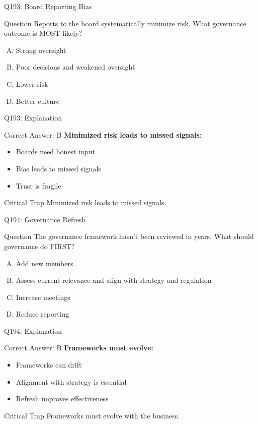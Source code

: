 \documentclass{beamer}
\begin{document}
	\begin{frame}{Q193: Board Reporting Bias}
		\begin{block}{Question}
			Reports to the board systematically minimize risk. What governance outcome is MOST likely?
		\end{block}
		\begin{enumerate}[(A)]
			\item Strong oversight
			\item Poor decisions and weakened oversight
			\item Lower risk
			\item Better culture
		\end{enumerate}
	\end{frame}
	
	\begin{frame}{Q193: Explanation}
		\begin{block}{Correct Answer: B}
			\textbf{Minimized risk leads to missed signals:}
			\begin{itemize}
				\item Boards need honest input
				\item Bias leads to missed signals
				\item Trust is fragile
			\end{itemize}
		\end{block}
		\begin{alertblock}{Critical Trap}
			Minimized risk leads to missed signals.
		\end{alertblock}
	\end{frame}
	
	\begin{frame}{Q194: Governance Refresh}
		\begin{block}{Question}
			The governance framework hasn't been reviewed in years. What should governance do FIRST?
		\end{block}
		\begin{enumerate}[(A)]
			\item Add new members
			\item Assess current relevance and align with strategy and regulation
			\item Increase meetings
			\item Reduce reporting
		\end{enumerate}
	\end{frame}
	
	\begin{frame}{Q194: Explanation}
		\begin{block}{Correct Answer: B}
			\textbf{Frameworks must evolve:}
			\begin{itemize}
				\item Frameworks can drift
				\item Alignment with strategy is essential
				\item Refresh improves effectiveness
			\end{itemize}
		\end{block}
		\begin{alertblock}{Critical Trap}
			Frameworks must evolve with the business.
		\end{alertblock}
	\end{frame}
	
\end{document}
